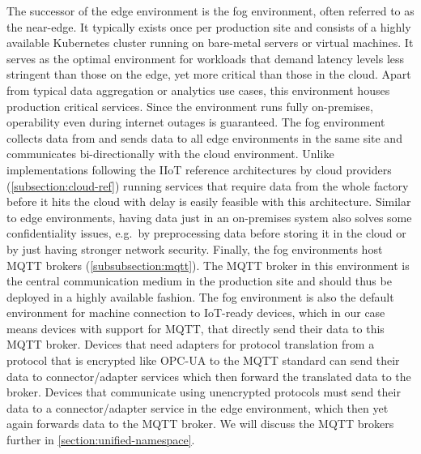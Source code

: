     The successor of the edge environment is the fog environment, often referred to as the near-edge. It typically exists once per production site and consists of a highly available Kubernetes cluster running on bare-metal servers or virtual machines. It serves as the optimal environment for workloads that demand latency levels less stringent than those on the edge, yet more critical than those in the cloud.  Apart from typical data aggregation or analytics use cases, this environment houses production critical services. Since the environment runs fully on-premises, operability even during internet outages is guaranteed. The fog environment collects data from and sends data to all edge environments in the same site and communicates bi-directionally with the cloud environment. Unlike implementations following the IIoT reference architectures by cloud providers (\autoref{subsection:cloud-ref}) running services that require data from the whole factory before it hits the cloud with delay is easily feasible with this architecture. Similar to edge environments, having data just in an on-premises system also solves some confidentiality issues, e.g.\ by preprocessing data before storing it in the cloud or by just having stronger network security. Finally, the fog environments host MQTT brokers (\autoref{subsubsection:mqtt}). The MQTT broker in this environment is the central communication medium in the production site and should thus be deployed in a highly available fashion. The fog environment is also the default environment for machine connection to IoT-ready devices, which in our case means devices with support for MQTT, that directly send their data to this MQTT broker. Devices that need adapters for protocol translation from a protocol that is encrypted like OPC-UA to the MQTT standard can send their data to connector/adapter services which then forward the translated data to the broker. Devices that communicate using unencrypted protocols must send their data to a connector/adapter service in the edge environment, which then yet again forwards data to the MQTT broker. We will discuss the MQTT brokers further in \autoref{section:unified-namespace}.

